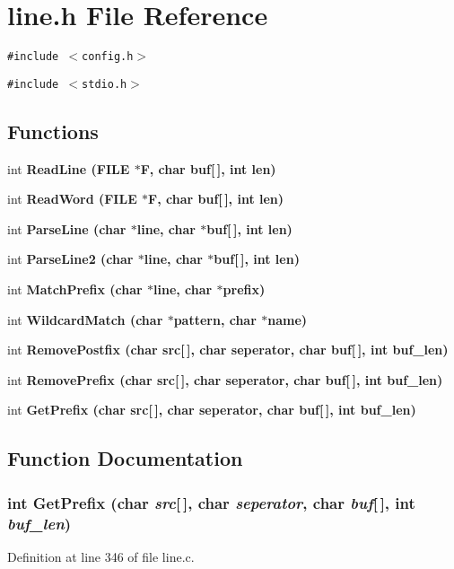 \section{line.h File Reference}
\label{line_8h}
{\tt \#include $<$config.h$>$}\par
{\tt \#include $<$stdio.h$>$}\par
\subsection*{Functions}
\begin{CompactItemize}
\item 
int \bf{Read\-Line} (FILE $\ast$\bf{F}, char buf[$\,$], int len)
\item 
int \bf{Read\-Word} (FILE $\ast$\bf{F}, char buf[$\,$], int len)
\item 
int \bf{Parse\-Line} (char $\ast$line, char $\ast$buf[$\,$], int len)
\item 
int \bf{Parse\-Line2} (char $\ast$line, char $\ast$buf[$\,$], int len)
\item 
int \bf{Match\-Prefix} (char $\ast$line, char $\ast$prefix)
\item 
int \bf{Wildcard\-Match} (char $\ast$pattern, char $\ast$\bf{name})
\item 
int \bf{Remove\-Postfix} (char src[$\,$], char seperator, char buf[$\,$], int buf\_\-len)
\item 
int \bf{Remove\-Prefix} (char src[$\,$], char seperator, char buf[$\,$], int buf\_\-len)
\item 
int \bf{Get\-Prefix} (char src[$\,$], char seperator, char buf[$\,$], int buf\_\-len)
\end{CompactItemize}


\subsection{Function Documentation}
\subsubsection{\setlength{\rightskip}{0pt plus 5cm}int Get\-Prefix (char {\em src}[$\,$], char {\em seperator}, char {\em buf}[$\,$], int {\em buf\_\-len})}\label{line_8h_ac3f1b6ac89780b864d10892481e21f8}




Definition at line 346 of file line.c.
